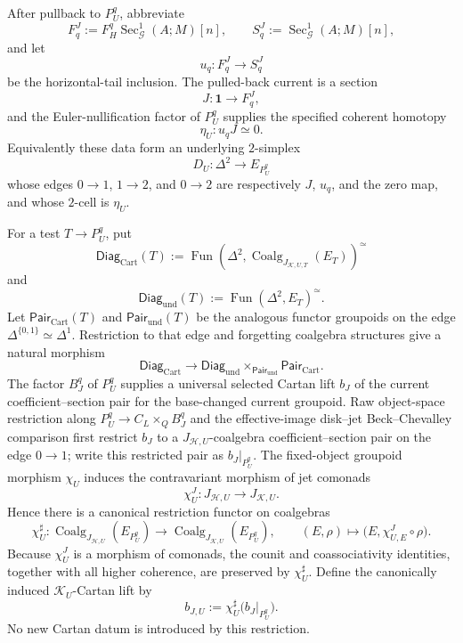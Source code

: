\begin{construction}
\label{def:symmetry-noether-internal-cartan-morphism-realization-object}
After pullback to $P_U^q$, abbreviate
\[
F_q^J
:=
F_H^q\operatorname{Sec}_{\mathcal G}^{1}(A;M)[n],
\qquad
S_q^J
:=
\operatorname{Sec}_{\mathcal G}^{1}(A;M)[n],
\]
and let
\[
u_q:F_q^J\longrightarrow S_q^J
\]
be the horizontal-tail inclusion.  The pulled-back current is a section
\[
J:\mathbf1\longrightarrow F_q^J,
\]
and the Euler-nullification factor of $P_U^q$ supplies the specified coherent
homotopy
\[
\eta_U:u_qJ\simeq0.
\]
Equivalently these data form an underlying $2$-simplex
\[
D_U:\Delta^2\longrightarrow E_{P_U^q}
\]
whose edges $0\to1$, $1\to2$, and $0\to2$ are respectively $J$, $u_q$, and the
zero map, and whose $2$-cell is $\eta_U$.

For a test $T\to P_U^q$, put
\[
\mathsf{Diag}_{\mathrm{Cart}}(T)
:=
\operatorname{Fun}
\left(
\Delta^2,
\operatorname{Coalg}_{J_{\mathcal K,U,T}}(E_T)
\right)^\simeq
\]
and
\[
\mathsf{Diag}_{\mathrm{und}}(T)
:=
\operatorname{Fun}(\Delta^2,E_T)^\simeq.
\]
Let $\mathsf{Pair}_{\mathrm{Cart}}(T)$ and
$\mathsf{Pair}_{\mathrm{und}}(T)$ be the analogous functor groupoids on the edge
$\Delta^{\{0,1\}}\simeq\Delta^1$.  Restriction to that edge and forgetting
coalgebra structures give a natural morphism
\[
\mathsf{Diag}_{\mathrm{Cart}}
\longrightarrow
\mathsf{Diag}_{\mathrm{und}}
\times_{\mathsf{Pair}_{\mathrm{und}}}
\mathsf{Pair}_{\mathrm{Cart}}.
\]
The factor $B_J^q$ of $P_U^q$ supplies a universal selected Cartan lift
$b_J$ of the current coefficient--section pair for the base-changed current
groupoid.  Raw object-space restriction along
$P_U^q\to C_L\times_QB_J^q$ and the effective-image disk--jet
Beck--Chevalley comparison first restrict $b_J$ to a
$J_{\mathcal H,U}$-coalgebra coefficient--section pair on the edge $0\to1$; write
this restricted pair as $b_J|_{P_U^q}$.  The fixed-object groupoid morphism
$\chi_U$ induces the contravariant morphism of jet comonads
\[
\chi_U^J:
J_{\mathcal H,U}
\longrightarrow
J_{\mathcal K,U}.
\]
Hence there is a canonical restriction functor on coalgebras
\[
\chi_U^{\sharp}:
\operatorname{Coalg}_{J_{\mathcal H,U}}(E_{P_U^q})
\longrightarrow
\operatorname{Coalg}_{J_{\mathcal K,U}}(E_{P_U^q}),
\qquad
(E,\rho)\longmapsto
\bigl(E,\chi_{U,E}^J\circ\rho\bigr).
\]
Because $\chi_U^J$ is a morphism of comonads, the counit and coassociativity
identities, together with all higher coherence, are preserved by
$\chi_U^{\sharp}$.  Define the canonically induced $\mathcal K_U$-Cartan lift by
\[
\boxed{
 b_{J,U}
 :=
 \chi_U^{\sharp}\bigl(b_J|_{P_U^q}\bigr).
}
\]
No new Cartan datum is introduced by this restriction.


\end{construction}
